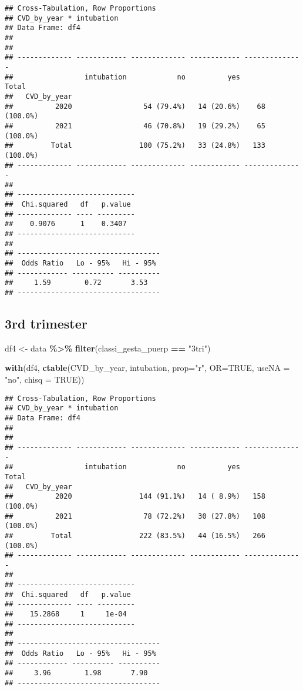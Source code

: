 \documentclass[
]{article}
\newenvironment{Shaded}{\begin{snugshade}}{\end{snugshade}}
\newcommand{\AttributeTok}[1]{\textcolor[rgb]{0.13,0.29,0.53}{#1}}
\newcommand{\ConstantTok}[1]{\textcolor[rgb]{0.56,0.35,0.01}{#1}}
\newcommand{\FunctionTok}[1]{\textcolor[rgb]{0.13,0.29,0.53}{\textbf{#1}}}
\newcommand{\NormalTok}[1]{#1}
\newcommand{\OtherTok}[1]{\textcolor[rgb]{0.56,0.35,0.01}{#1}}
\newcommand{\SpecialCharTok}[1]{\textcolor[rgb]{0.81,0.36,0.00}{\textbf{#1}}}
\newcommand{\StringTok}[1]{\textcolor[rgb]{0.31,0.60,0.02}{#1}}
\begin{document}
\begin{verbatim}
## Cross-Tabulation, Row Proportions  
## CVD_by_year * intubation  
## Data Frame: df4  
## 
## 
## ------------- ------------ ------------- ------------ --------------
##                 intubation            no          yes          Total
##   CVD_by_year                                                       
##          2020                 54 (79.4%)   14 (20.6%)    68 (100.0%)
##          2021                 46 (70.8%)   19 (29.2%)    65 (100.0%)
##         Total                100 (75.2%)   33 (24.8%)   133 (100.0%)
## ------------- ------------ ------------- ------------ --------------
## 
## ----------------------------
##  Chi.squared   df   p.value 
## ------------- ---- ---------
##    0.9076      1    0.3407  
## ----------------------------
## 
## ----------------------------------
##  Odds Ratio   Lo - 95%   Hi - 95% 
## ------------ ---------- ----------
##     1.59        0.72       3.53   
## ----------------------------------
\end{verbatim}

\hypertarget{rd-trimester-7}{%
\subsection{3rd trimester}\label{rd-trimester-7}}

\begin{Shaded}
\begin{Highlighting}[]
\NormalTok{df4 }\OtherTok{\textless{}{-}}\NormalTok{ data }\SpecialCharTok{\%\textgreater{}\%} 
  \FunctionTok{filter}\NormalTok{(classi\_gesta\_puerp }\SpecialCharTok{==} \StringTok{"3tri"}\NormalTok{)}

\FunctionTok{with}\NormalTok{(df4, }\FunctionTok{ctable}\NormalTok{(CVD\_by\_year, intubation, }\AttributeTok{prop=}\StringTok{"r"}\NormalTok{, }\AttributeTok{OR=}\ConstantTok{TRUE}\NormalTok{, }\AttributeTok{useNA =} \StringTok{"no"}\NormalTok{, }\AttributeTok{chisq =} \ConstantTok{TRUE}\NormalTok{))}
\end{Highlighting}
\end{Shaded}

\begin{verbatim}
## Cross-Tabulation, Row Proportions  
## CVD_by_year * intubation  
## Data Frame: df4  
## 
## 
## ------------- ------------ ------------- ------------ --------------
##                 intubation            no          yes          Total
##   CVD_by_year                                                       
##          2020                144 (91.1%)   14 ( 8.9%)   158 (100.0%)
##          2021                 78 (72.2%)   30 (27.8%)   108 (100.0%)
##         Total                222 (83.5%)   44 (16.5%)   266 (100.0%)
## ------------- ------------ ------------- ------------ --------------
## 
## ----------------------------
##  Chi.squared   df   p.value 
## ------------- ---- ---------
##    15.2868     1     1e-04  
## ----------------------------
## 
## ----------------------------------
##  Odds Ratio   Lo - 95%   Hi - 95% 
## ------------ ---------- ----------
##     3.96        1.98       7.90   
## ----------------------------------
\end{verbatim}
\end{document}

